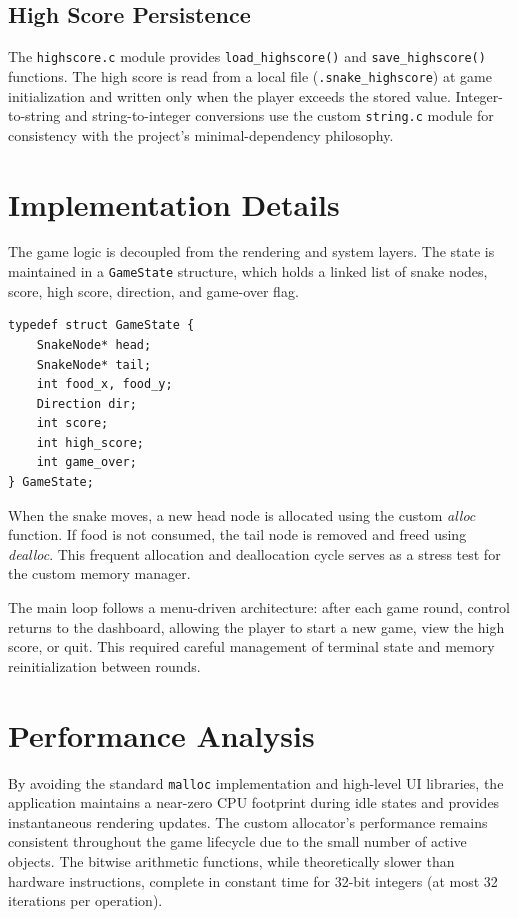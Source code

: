 \documentclass[conference]{IEEEtran}
\begin{document}
\subsection{High Score Persistence}
The \texttt{highscore.c} module provides \texttt{load\_highscore()} and \texttt{save\_highscore()} functions. The high score is read from a local file (\texttt{.snake\_highscore}) at game initialization and written only when the player exceeds the stored value. Integer-to-string and string-to-integer conversions use the custom \texttt{string.c} module for consistency with the project's minimal-dependency philosophy.

\section{Implementation Details}
The game logic is decoupled from the rendering and system layers. The state is maintained in a \texttt{GameState} structure, which holds a linked list of snake nodes, score, high score, direction, and game-over flag.

\begin{lstlisting}[caption=Game State Structure]
typedef struct GameState {
    SnakeNode* head;
    SnakeNode* tail;
    int food_x, food_y;
    Direction dir;
    int score;
    int high_score;
    int game_over;
} GameState;
\end{lstlisting}

When the snake moves, a new head node is allocated using the custom \textit{alloc} function. If food is not consumed, the tail node is removed and freed using \textit{dealloc}. This frequent allocation and deallocation cycle serves as a stress test for the custom memory manager.

The main loop follows a menu-driven architecture: after each game round, control returns to the dashboard, allowing the player to start a new game, view the high score, or quit. This required careful management of terminal state and memory reinitialization between rounds.

\section{Performance Analysis}
By avoiding the standard \texttt{malloc} implementation and high-level UI libraries, the application maintains a near-zero CPU footprint during idle states and provides instantaneous rendering updates. The custom allocator's performance remains consistent throughout the game lifecycle due to the small number of active objects. The bitwise arithmetic functions, while theoretically slower than hardware instructions, complete in constant time for 32-bit integers (at most 32 iterations per operation).
\end{document}
